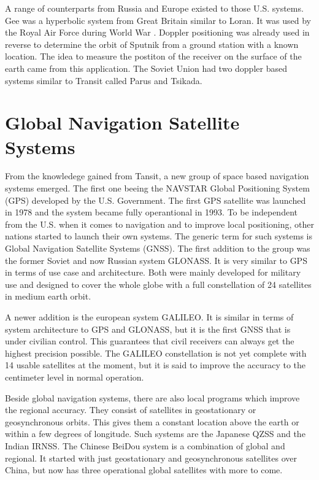 A range of counterparts from Russia and Europe existed to those U.S. systems.
Gee was a hyperbolic system from Great Britain similar to Loran.
It was used by the Royal Air Force during World War .
Doppler positioning was already used in reverse to determine the orbit of Sputnik  from a ground station with a known location.
The idea to measure the postiton of the receiver on the surface of the earth came from this application.
The Soviet Union had two doppler based systems similar to Transit called Parus and Tsikada. \cite{misra2011global}


\section{Global Navigation Satellite Systems}

From the knowledege gained from Tansit, a new group of space based navigation systems emerged. 
The first one beeing the NAVSTAR Global Positioning System (GPS) developed by the U.S. Government.
The first GPS satellite was launched in 1978 and the system became fully operantional in 1993.
To be independent from the U.S. when it comes to navigation and to improve local positioning, other nations started to launch their own systems.
The generic term for such systems is Global Navigation Satellite Systems (GNSS).
The first addition to the group was the former Soviet and now Russian system GLONASS.
It is very similar to GPS in terms of use case and architecture.
Both were mainly developed for military use and designed to cover the whole globe with a full constellation of 24 satellites in medium earth orbit. \cite{misra2011global}

A newer addition is the european system GALILEO.
It is similar in terms of system architecture to GPS and GLONASS, but it is the first GNSS that is under civilian control.
This guarantees that civil receivers can always get the highest precision possible.
The GALILEO constellation is not yet complete with 14 usable satellites at the moment, but it is said to improve the accuracy to the centimeter level in normal operation. \cite{GSA_Galileo}

Beside global navigation systems, there are also local programs which improve the regional accuracy.
They consist of satellites in geostationary or geosynchronous orbits.
This gives them a constant location above the earth or within a few degrees of longitude.
Such systems are the Japanese QZSS and the Indian IRNSS.
The Chinese BeiDou system is a combination of global and regional.
It started with just geostationary and geosynchronous satellites over China, but now has three operational global satellites with more to come. \cite{GLONASS}


